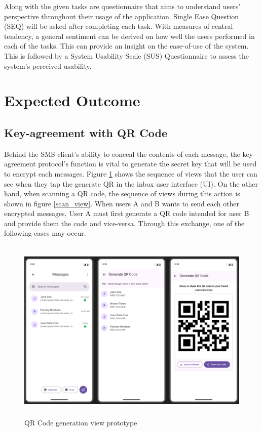 \documentclass[journal]{./IEEE/IEEEtran}
\begin{document}
Along with the given tasks are questionnaire that aims to understand users'
perspective throughout their usage of the application. Single Ease Question
(SEQ) will be asked after completing each task. With measures of central
tendency, a general sentiment can be derived on how well the users performed
in each of the tasks. This can provide an insight on the ease-of-use of the
system. This is followed by a System Usability Scale (SUS) Questionnaire
to assess the system's perceived usability.

\section{Expected Outcome}
\subsection{Key-agreement with QR Code}
Behind the SMS client's ability to conceal the contents of each message, the
key-agreement protocol's function is vital to generate the secret key that
will be used to encrypt each messages. Figure \ref{generate_view} shows the
sequence of views that the user can see when they tap the generate QR in the
inbox user interface (UI). On the other hand, when scanning a QR code,
the sequence of views during this action is shown in figure \ref{scan_view}.
When users A and B wants to send each other encrypted messages, User A must
first generate a QR code intended for user B and provide them the code and
vice-versa. Through this exchange, one of the following cases may occur.

\begin{figure}
	\centering
	\includegraphics[height=3.5in]{./images/Generate_QR_prototype.png}
	\caption{QR Code generation view prototype}
	\label{generate_view}
\end{figure}
\end{document}
